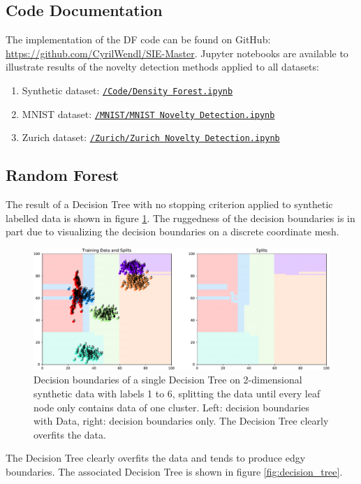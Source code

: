 \documentclass[10pt]{article}
\begin{document}
\subsection{Code Documentation}
\label{subsec:implementation}
The implementation of the \acrlong{DF} code can be found on GitHub: \url{https://github.com/CyrilWendl/SIE-Master}. Jupyter notebooks are available to illustrate results of the novelty detection methods applied to all datasets:
\begin{enumerate}
    \item Synthetic dataset:  \href{https://github.com/CyrilWendl/SIE-Master/blob/master/Code/Density%20Forest.ipynb}{\texttt{/Code/Density Forest.ipynb}}
    \item \gls{MNIST} dataset: \href{https://github.com/CyrilWendl/SIE-Master/blob/master/MNIST/MNIST%20Novelty%20Detection.ipynb}{\texttt{/MNIST/MNIST Novelty Detection.ipynb}}
    \item Zurich dataset: \href{https://github.com/CyrilWendl/SIE-Master/blob/master/Zurich/Zurich%20Dataset%20Novelty%20Detection.ipynb}{\texttt{/Zurich/Zurich Novelty Detection.ipynb}}
\end{enumerate}

\subsection{Random Forest}
\label{app:rf}
The result of a Decision Tree with no stopping criterion applied to synthetic labelled data is shown in figure \ref{fig:decision-boundaries}. The ruggedness of the decision boundaries is in part due to visualizing the decision boundaries on a discrete coordinate mesh.

\begin{figure}[H]
    \centering
    \includegraphics[width=\textwidth]{decision_boundaries}
    \caption{Decision boundaries of a single Decision Tree on 2-dimensional synthetic data with labels 1 to 6, splitting the data until every leaf node only contains data of one cluster. Left: decision boundaries with Data, right: decision boundaries only. The Decision Tree clearly overfits the data.}
    \label{fig:decision-boundaries}
\end{figure}
The Decision Tree clearly overfits the data and tends to produce edgy boundaries. The associated Decision Tree is shown in figure \ref{fig:decision_tree}.
\end{document}
